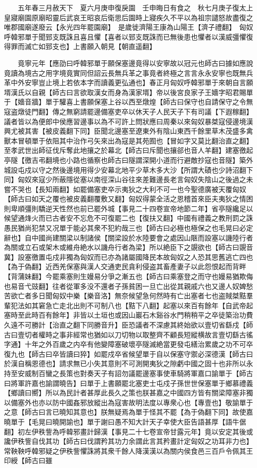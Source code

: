 　　五年春三月赦天下　夏六月庚申復戾園　壬申晦日有食之　秋七月庚子復太上皇寢廟園原廟昭靈后武哀王昭哀后衛思后園時上寢疾久不平以為祖宗譴怒故盡復之唯郡國廟遂廢云【永光四年罷園廟】　是歲徙濟陽王康為山陽王【濟子禮翻】　匈奴呼韓邪單于聞郅支既誅且喜且懼【喜者以郅支既誅而已無後患也懼者以漢威彊懼復得罪而滅亡如郅支也】上書願入朝見【朝直遥翻】

　　竟寧元年【應劭曰呼韓邪單于願保塞邊竟得以安寧故以冠元也師古曰據如應說竟讀為境古之用字境竟實同但詔云長無兵革之事竟者終極之言言永永安寧也既無兵革中外安寧豈止境上若依本字而讀義更弘通也】春正月匈奴呼韓邪單于來朝自言願壻漢氏以自親【師古曰言欲取漢女而身為漢家壻】帝以後宮良家子王嬙字昭君賜單于【嬙音牆】單于驩喜上書願保塞上谷以西至燉煌【師古曰保守也自請保守之令無寇盗燉徒門翻】傳之無窮請罷邊備塞吏卒以休天子人民天子下有司議【下遐稼翻】議者皆以為便郎中侯應習邊事以為不可許上問狀應曰周秦以來匈奴暴桀寇侵邊境漢興尤被其害【被皮義翻下同】臣聞北邊塞至遼東外有陰山東西千餘里草木茂盛多禽獸本冒頓單于依阻其中治作弓矢來出為寇是其苑囿也【冒如字又莫比翻治直之翻】至孝武世出師征伐斥奪此地攘之於幕北【師古曰斥聞也攘郤也音人羊翻】建塞徼起亭隧【徼吉弔翻境也小路也循察也師古曰隧謂深開小道而行避敵抄寇也音隧】築外城設屯戍以守之然後邊境用得少安幕北地平少草木多大沙【所謂大磧也少詩沼翻下同】匈奴來寇少所蔽隱從塞以南徑深山谷往來差難邊長老言匈奴失陰山之後過之未嘗不哭也【長知兩翻】如罷備塞吏卒示夷狄之大利不可一也今聖德廣被天覆匈奴【師古曰如天之覆也被皮義翻覆敷又翻】匈奴得蒙全活之恩稽首來臣夫夷狄之情困則卑順彊則驕逆天性然也前已罷外城【事見二十四卷宣帝地節二年】省亭隧纔足以候望通烽火而已古者安不忘危不可復罷二也【復扶又翻】中國有禮義之教刑罰之誅愚民猶尚犯禁又况單于能必其衆不犯約哉三也【師古曰必極也極保之也毛晃曰必定辭也】自中國尚建關梁以制諸侯【關梁設於水陸要會之處因山陿而設塞以譏陸行者為關或立石或架木或維舟絶水以譏舟行者為梁】所以絶臣下之覬欲也【師古曰覬音冀】設塞徼置屯戍非獨為匈奴而已亦為諸屬國降民本故匈奴之人恐其思舊逃亡四也【為于偽翻】近西羌保塞與漢人交通吏民貪利侵盗其畜產妻子以此怨恨起而背畔【背蒲妹翻】今罷乘塞則生嫚易分爭之漸五也【師古曰乘塞登之而守也嫚易猶欺侮也易音弋豉翻】往者從軍多没不還者子孫貧困一旦亡出從其親戚六也又邊人奴婢愁苦欲亡者多日聞匈奴中樂【樂音洛】無奈候望急何然時有亡出塞者七也盗賊桀黠羣輩犯法如其窘急亡走北出則不可制八也【黠下八翻】起塞以來百有餘年【自武帝起塞時至此時百有餘年】非皆以土垣也或因山巖石木谿谷水門稍稍平之卒徒築治功費久遠不可勝計【治直之翻下同勝音升】臣恐議者不深慮其終始欲以壹切省繇戍【師古曰壹切者權時之事非經常也猶如以刀切物以取整齊不顧長短縱横故言壹切繇古徭字通】十年之外百歲之内卒有他變障塞破壞亭隧滅絶當更發屯繕治累歲之功不可卒復九也【師古曰卒皆讀曰猝】如罷戍卒省候望單于自以保塞守禦必深德漢【師古曰於漢自稱恩德也】請求無已小失其意則不可測開夷狄之隙虧中國之固十也非所以永持至安威制百蠻之長策也對奏天子有詔勿議罷邊塞事使車騎將軍嘉口諭單于【師古曰將軍許嘉也諭謂曉告】曰單于上書願罷北塞吏士屯戍子孫世世保塞單于鄉慕禮義【鄉讀曰嚮】所以為民計者甚厚此長久之策也朕甚嘉之中國四方皆有關梁障塞非獨以備塞外也亦以防中國姦邪放縱出為寇害故明法度以專衆心也【專壹也】敬諭單于之意【師古曰言已曉知其意也】朕無疑焉為單于怪其不罷【為于偽翻下同】故使嘉曉單于【毛晃曰曉開諭也】單于謝曰愚不知大計天子幸使大臣告語甚厚【語牛倨翻】初左伊秩訾為呼韓邪畫計歸漢【事見二十七卷宣帝甘露元年】竟以安定其後或讒伊秩訾自伐其功【師古曰伐謂矜其功力余謂此言其矜畫計定匈奴之功耳非力也】常鞅鞅呼韓邪疑之伊秩訾懼誅將其衆千餘人降漢漢以為關内侯食邑三百戶令佩其王印綬【師古曰雖